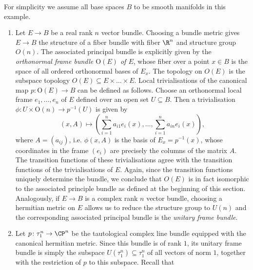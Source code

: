 \begin{example} For simplicity we assume all base spaces $B$ to be smooth manifolds in this example. \vspace{-.5cm}
    \label{bundles:ex:associated_bundles}
    \begin{enumerate}[label=(\roman*)]
        \item Let $E \to B$ be a real rank $n$ vector bundle. Choosing a bundle metric gives $E \to B$ the structure of a fiber bundle with fiber $\R^n$ and structure group $O(n)$. The associated principal bundle is explicitly given by the \textit{orthonormal frame bundle $\mathrm{O}(E)$ of $E$}, whose fiber over a point $x \in B$ is the space of all ordered orthonormal bases of $E_x$. The topology on $O(E)$ is the subspace topology $O(E) \subseteq E \times \ldots \times E$. Local trivialisations of the canonical map $p \colon \mathrm{O}(E) \to B$ can be defined as follows. Choose an orthonormal local frame $e_1,\ldots,e_n$ of $E$ defined over an open set $U \subseteq B$. Then a trivialisation $\phi \colon U \times \mathrm{O}(n) \to p^{-1}(U)$ is given by
        \[
            (x,A) \mapsto \left(\sum_{i=1}^n a_{i1}e_i(x),\ldots,\sum_{i=1}^n a_{in}e_i(x)\right),
        \]
        where $A = (a_{ij})$, i.e. $\phi(x,A)$ is the basis of $E_x = p^{-1}(x)$, whose coordinates in the frame $(e_i)$ are precisely the columns of the matrix $A$. The transition functions of these trivialisations agree with the transition functions of the trivialisations of $E$. Again, since the transition functions uniquely determine the bundle, we conclude that $O(E)$ is in fact isomorphic to the associated principle bundle as defined at the beginning of this section. Analogously, if $E \to B$ is a complex rank $n$ vector bundle, choosing a hermitian metric on $E$ allows us to reduce the structure group to $U(n)$ and the corresponding associated principal bundle is the \textit{unitary frame bundle}. 
        \item \label{bundles:ex:associated_bundles_cpn} Let $p \colon \tau_1^n \to \CP^n$ be the tautological complex line bundle equipped with the canonical hermitian metric. Since this bundle is of rank $1$, its unitary frame bundle is simply the subspace $U(\tau_1^n) \subseteq \tau_1^n$ of all vectors of norm $1$, together with the restriction of $p$ to this subspace. Recall that

\end{enumerate}
\end{example}
